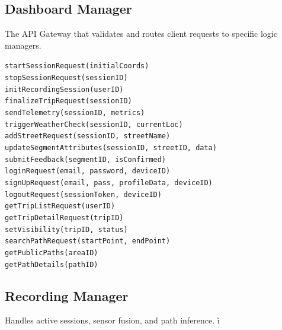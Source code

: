 \subsection{Dashboard Manager}
The API Gateway that validates and routes client requests to specific logic managers.

        \texttt{startSessionRequest(initialCoords)}\\
        \texttt{stopSessionRequest(sessionID)}\\
        \texttt{initRecordingSession(userID)}\\
        \texttt{finalizeTripRequest(sessionID)}\\
        \texttt{sendTelemetry(sessionID, metrics)}\\
        \texttt{triggerWeatherCheck(sessionID, currentLoc)}\\
        \texttt{addStreetRequest(sessionID, streetName)}\\
        \texttt{updateSegmentAttributes(sessionID, streetID, data)}\\
        \texttt{submitFeedback(segmentID, isConfirmed)}\\
        \texttt{loginRequest(email, password, deviceID)}\\
        \texttt{signUpRequest(email, pass, profileData, deviceID)}\\
        \texttt{logoutRequest(sessionToken, deviceID)}\\
        \texttt{getTripListRequest(userID)}\\
        \texttt{getTripDetailRequest(tripID)}\\
        \texttt{setVisibility(tripID, status)}\\
        \texttt{searchPathRequest(startPoint, endPoint)}\\
        \texttt{getPublicPaths(areaID)}\\
        \texttt{getPathDetails(pathID)}
        

\subsection{Recording Manager}
Handles active sessions, sensor fusion, and path inference.
ì
    
